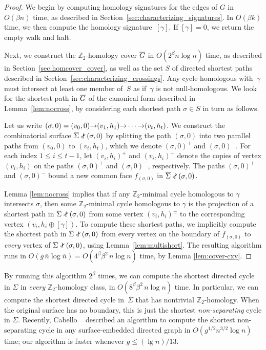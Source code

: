 \documentclass[11pt,twoside]{article}
\def\arcto{\mathord\shortrightarrow}
\def\Z{\mathbb{Z}}
\def\snip{\mathbin{\raisebox{0.15ex}{\rotatebox[origin=c]{60}{\Rightscissors}\!}}}
\def\snip{\mathbin{\raisebox{0.15ex}{\rotatebox[origin=c]{60}{\Rightscissors}\!}}}
\let\cycle\gamma
\def\Sigmabar{\overline{\smash{\Sigma}\vphantom{t}}}
\def\Gbar{\overline{\smash{G}\vphantom{t}}}
\def\nbar{\overline{n}}
\def\gbar{\overline{g}}
\begin{document}
{\begin{proof}
We begin by computing homology signatures for the edges of $G$ in $O(\beta n)$ time, as described in Section~\ref{sec:characterizing_signatures}.  In $O(\beta k)$ time, we then compute the homology signature~$[\cycle]$.  If $[\cycle] = 0$, we return the empty walk and halt.

Next, we construct the $\Z_2$-homology cover $\Gbar$ in $O(2^\beta n\log n)$ time, as described in Section~\ref{sec:homcover_cover}, as well as the set $S$ of directed shortest paths described in Section~\ref{sec:characterizing_crossings}.
Any cycle homologous with~$\cycle$ must intersect at least one member of~$S$ as if~$\cycle$ is not null-homologous.
We look for the shortest path in $\Gbar$ of the canonical form described in Lemma~\ref{lem:nocross}, by considering each shortest path $\sigma\in S$ in turn as follows.

Let us write $(\sigma,0) = (v_0,0) \arcto (v_1,h_1) \arcto\allowbreak \cdots\arcto (v_t, h_t)$.  We construct the combinatorial surface $\Sigmabar\snip(\sigma,0)$ by splitting the path $(\sigma,0)$ into two parallel paths from $(v_0,0)$ to $(v_t,h_t)$, which we denote  $(\sigma,0)^+$ and $(\sigma,0)^-$.  For each index $1\le i\le t-1$, let $(v_i,h_i)^+$ and $(v_i,h_i)^-$ denote the copies of vertex $(v_i,h_i)$  on the paths $(\sigma,0)^+$ and $(\sigma,0)^-$, respectively.  The paths $(\sigma,0)^+$ and $(\sigma,0)^-$ bound a new common face $f_{(\sigma,0)}$ in $\Sigmabar\snip(\sigma,0)$.

Lemma \ref{lem:nocross} implies that if any $\Z_2$-minimal cycle homologous to $\cycle$ intersects $\sigma$, then some $\Z_2$-minimal cycle homologous to $\cycle$ is the projection of a shortest path in $\Sigmabar\snip(\sigma,0)$ from some vertex $(v_i,h_i)^\pm$ to the corresponding vertex $(v_i, h_i\oplus[\cycle])$.  To compute these shortest paths, we implicitly compute the shortest path in $\Sigmabar\snip(\sigma,0)$ from every vertex on the boundary of $f_{(\sigma,0)}$ to \emph{every} vertex of $\Sigmabar\snip(\sigma,0)$, using Lemma~\ref{lem:multishort}.  The resulting algorithm runs in $O(\gbar\,\nbar \log \nbar) = O(4^\beta \beta^2\, n\log n)$ time, by Lemma \ref{lem:cover-cxy}.
\end{proof}

By running this algorithm $2^\beta$ times, we can compute the shortest directed cycle in $\Sigma$ in \emph{every} $\Z_2$-homology class, in $O(8^\beta \beta^2\, n\log n)$ time.  In particular, we can compute the shortest directed cycle in~$\Sigma$ that has nontrivial $\Z_2$-homology.  When the original surface has no boundary, this is just the shortest \emph{non-separating} cycle in $\Sigma$.  Recently, Cabello \etal~\cite{ccl-fsncd-10} described an algorithm to compute the shortest non-separating cycle in any surface-embedded directed graph in $O(g^{1/2} n^{3/2}\log n)$ time; our algorithm is faster whenever $g \le (\lg n)/13$.

}
\end{document}
